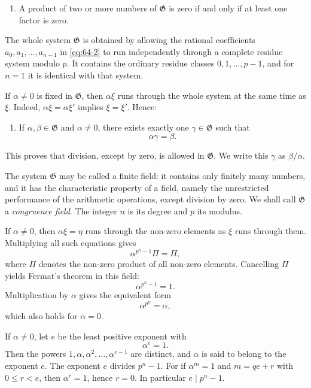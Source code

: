 \documentclass[11pt,a4paper]{book}
\begin{document}
\begin{enumerate}[label=\arabic*.,resume]
\item A product of two or more numbers of \(\mathfrak G\) is zero if and only if at least one factor is zero.
\end{enumerate}
The whole system \(\mathfrak G\) is obtained by allowing the rational coefficients \(a_0,a_1,\ldots,a_{n-1}\) in \eqref{eq:64-2} to run independently through a complete residue system modulo \(p\).  It contains the ordinary residue classes \(0,1,\ldots,p-1\), and for \(n=1\) it is identical with that system.

If \(\alpha\ne0\) is fixed in \(\mathfrak G\), then \(\alpha\xi\) runs through the whole system at the same time as \(\xi\).  Indeed, \(\alpha\xi=\alpha\xi'\) implies \(\xi=\xi'\).  Hence:

\begin{enumerate}[label=\arabic*.,resume]
\item If \(\alpha,\beta\in\mathfrak G\) and \(\alpha\ne0\), there exists exactly one \(\gamma\in\mathfrak G\) such that
\[
 \alpha\gamma=\beta.
\]
\end{enumerate}
This proves that division, except by zero, is allowed in \(\mathfrak G\).  We write this \(\gamma\) as \(\beta/\alpha\).

The system \(\mathfrak G\) may be called a finite field: it contains only finitely many numbers, and it has the characteristic property of a field, namely the unrestricted performance of the arithmetic operations, except division by zero.  We shall call \(\mathfrak G\) a \emph{congruence field}.  The integer \(n\) is its degree and \(p\) its modulus.

If \(\alpha\ne0\), then \(\alpha\xi=\eta\) runs through the non-zero elements as \(\xi\) runs through them.  Multiplying all such equations gives
\[
 \alpha^{p^n-1}\Pi=\Pi,
\]
where \(\Pi\) denotes the non-zero product of all non-zero elements.  Cancelling \(\Pi\) yields Fermat's theorem in this field:
\begin{equation}\label{eq:64-3}
 \alpha^{p^n-1}=1.
\end{equation}
Multiplication by \(\alpha\) gives the equivalent form
\begin{equation}\label{eq:64-4}
 \alpha^{p^n}=\alpha,
\end{equation}
which also holds for \(\alpha=0\).

If \(\alpha\ne0\), let \(e\) be the least positive exponent with
\begin{equation}\label{eq:64-5}
 \alpha^e=1.
\end{equation}
Then the powers \(1,\alpha,\alpha^2,\ldots,\alpha^{e-1}\) are distinct, and \(\alpha\) is said to belong to the exponent \(e\).  The exponent \(e\) divides \(p^n-1\).  For if \(\alpha^m=1\) and \(m=qe+r\) with \(0\le r<e\), then \(\alpha^r=1\), hence \(r=0\).  In particular \(e\mid p^n-1\).
\end{document}

